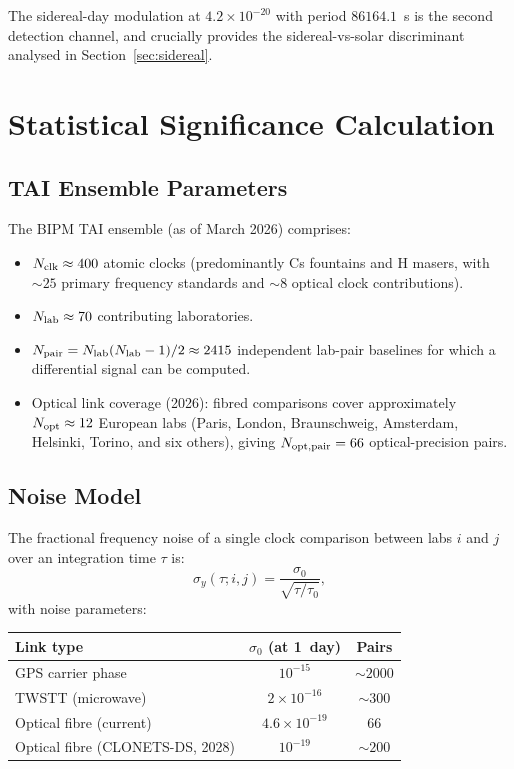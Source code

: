 \documentclass[aps,prd,twocolumn,superscriptaddress,nofootinbib]{revtex4-2}
\begin{document}
The sidereal-day modulation at $4.2\times10^{-20}$ with period $86164.1$~s
is the second detection channel, and crucially provides the sidereal-vs-solar
discriminant analysed in Section~\ref{sec:sidereal}.

\section{Statistical Significance Calculation}
\label{sec:statistics}

\subsection{TAI Ensemble Parameters}

The BIPM TAI ensemble (as of March 2026) comprises:
\begin{itemize}
\item $N_{\rm clk} \approx 400$ atomic clocks (predominantly Cs fountains
      and H masers, with $\sim 25$ primary frequency standards and
      $\sim 8$ optical clock contributions).
\item $N_{\rm lab} \approx 70$ contributing laboratories.
\item $N_{\rm pair} = N_{\rm lab}(N_{\rm lab}-1)/2 \approx 2415$ independent
      lab-pair baselines for which a differential signal can be computed.
\item Optical link coverage (2026): fibred comparisons cover approximately
      $N_{\rm opt} \approx 12$ European labs (Paris, London, Braunschweig,
      Amsterdam, Helsinki, Torino, and six others), giving
      $N_{\rm opt,pair} = 66$ optical-precision pairs.
\end{itemize}

\subsection{Noise Model}

The fractional frequency noise of a single clock comparison between labs $i$
and $j$ over an integration time $\tau$ is:
\begin{equation}
\sigma_y(\tau; i,j) = \frac{\sigma_0}{\sqrt{\tau/\tau_0}},
\label{eq:noise}
\end{equation}
with noise parameters:

\begin{center}
\begin{tabular}{lcc}
\toprule
Link type & $\sigma_0$ (at 1~day) & Pairs \\
\midrule
GPS carrier phase & $10^{-15}$ & $\sim 2000$ \\
TWSTT (microwave) & $2\times10^{-16}$ & $\sim 300$ \\
Optical fibre (current) & $4.6\times10^{-19}$ & $66$ \\
Optical fibre (CLONETS-DS, 2028) & $10^{-19}$ & $\sim 200$ \\
\bottomrule
\end{tabular}
\end{center}
\end{document}
